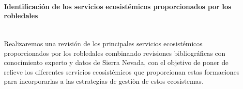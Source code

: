 \paragraph{Identificación de los servicios ecosistémicos proporcionados por los robledales}\mbox{} \\
Realizaremos una revisión de los principales servicios ecosistémicos proporcionados por los robledales combinando revisiones bibliográficas con conocimiento experto y datos de Sierra Nevada, con el objetivo de poner de relieve los diferentes servicios ecosistémicos que proporcionan estas formaciones para incorporarlas a las estrategias de gestiòn de estos ecosistemas. 

